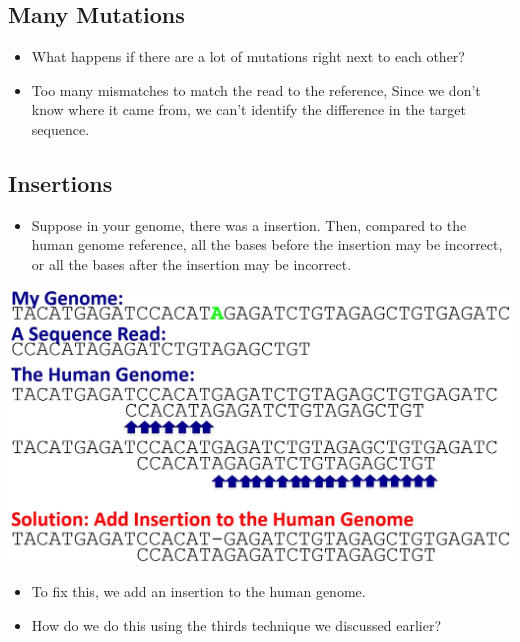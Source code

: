 \documentclass[10pt]{article}
\begin{document}
\subsection*{Many Mutations}
\begin{itemize}
    \item What happens if there are a lot of mutations right next to each other?
    \item Too many mismatches to match the read to the reference,  Since we don't know where it came from, we can't identify the difference in the target sequence.
\end{itemize}
\subsection*{Insertions}
\begin{itemize}
    \item Suppose in your genome, there was a insertion.  Then, compared to the human genome reference, all the bases before the insertion may be incorrect, or all the bases after the insertion may be incorrect.
\end{itemize}
\begin{center}
    \includegraphics*[scale=0.4]{W1_5.png}
\end{center}
\begin{itemize}
    \item To fix this, we add an insertion to the human genome.
    \item How do we do this using the thirds technique we discussed earlier?
\end{itemize}
\end{document}
